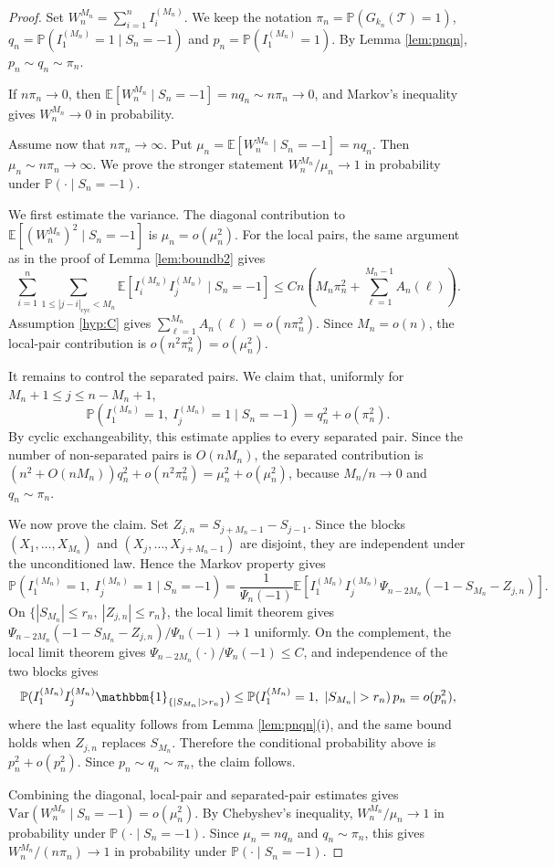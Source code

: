 \documentclass[a4paper,11pt]{article}
\newcommand{\E}{\mathbb{E}}
\DeclareRobustCommand{\P}{\mathbb{P}}
\DeclareRobustCommand{\1}{\mathbf{1}}
\newcommand{\Var}{\mathrm{Var}}
\begin{document}
\begin{proof}
Set $W_n^{M_n}=\sum_{i=1}^n I_i^{(M_n)}$. We keep the notation $ \pi_{n}=\P(G_{k_{n}}( \mathcal{T})=1)$, $q_n=\P(I_1^{(M_n)}=1\mid S_n=-1)$ and $p_n=\P(I_1^{(M_n)}=1)$. By Lemma \ref{lem:pnqn}, $p_n \sim q_n \sim \pi_n$.

If $n\pi_n\to0$, then
$\E[W_n^{M_n}\mid S_n=-1]=nq_n\sim n\pi_n\to0$, and Markov's inequality gives
$W_n^{M_n}\to0$ in probability.

Assume now that $n\pi_n\to\infty$. Put
$\mu_n=\E[W_n^{M_n}\mid S_n=-1]=nq_n$. Then
$\mu_n\sim n\pi_n\to\infty$. We prove the stronger statement
$W_n^{M_n}/\mu_n\to1$ in probability under $\P(\cdot\mid S_n=-1)$.

We first estimate the variance. The diagonal contribution to
$\E[(W_n^{M_n})^2\mid S_n=-1]$ is $\mu_n=o(\mu_n^2)$. For the local pairs, the same argument as in the proof of Lemma
\ref{lem:boundb2} gives
$$
\sum_{i=1}^n
\sum_{1\le |j-i|_{\mathrm{cyc}}<M_n}
\E[I_i^{(M_n)}I_j^{(M_n)}\mid S_n=-1]
\le
C n\left(M_n\pi_n^2+\sum_{\ell=1}^{M_n-1}A_n(\ell)\right).
$$
Assumption \ref{hyp:C} gives
$\sum_{\ell=1}^{M_n}A_n(\ell)=o(n\pi_n^2)$. Since $M_n=o(n)$, the local-pair
contribution is $o(n^2\pi_n^2)=o(\mu_n^2)$.

It remains to control the separated pairs. We claim that, uniformly for
$M_n+1\le j\le n-M_n+1$,
$$
\P(I_1^{(M_n)}=1,\ I_j^{(M_n)}=1\mid S_n=-1)
=
q_n^2+o(\pi_n^2).
$$
By cyclic exchangeability, this estimate applies to every separated pair. Since
the number of non-separated pairs is $O(nM_n)$, the separated contribution is
$(n^2+O(nM_n))q_n^2+o(n^2\pi_n^2)=\mu_n^2+o(\mu_n^2)$, because
$M_n/n\to0$ and $q_n\sim\pi_n$.

We now prove the claim. Set $Z_{j,n}=S_{j+M_n-1}-S_{j-1}$. Since the blocks
$(X_1,\ldots,X_{M_n})$ and $(X_j,\ldots,X_{j+M_n-1})$ are disjoint, they are
independent under the unconditioned law. Hence the Markov property gives
$$
\P(I_1^{(M_n)}=1,\ I_j^{(M_n)}=1\mid S_n=-1)
=
\frac{1}{\Psi_n(-1)}
\E\left[
I_1^{(M_n)}I_j^{(M_n)}
\Psi_{n-2M_n}(-1-S_{M_n}-Z_{j,n})
\right].
$$
On $\{|S_{M_n}|\le r_n,\ |Z_{j,n}|\le r_n\}$, the local limit theorem gives
$\Psi_{n-2M_n}(-1-S_{M_n}-Z_{j,n})/\Psi_n(-1)\to1$ uniformly. On the
complement, the local limit theorem gives
$\Psi_{n-2M_n}(\cdot)/\Psi_n(-1)\le C$, and independence of the two blocks
gives
$$
\P(I_1^{(M_n)}I_j^{(M_n)}\mathbbm{1}_{\{|S_{M_n}|>r_n\}})
\le
\P(I_1^{(M_n)}=1,\ |S_{M_n}|>r_n)\,p_n
=o(p_n^2),
$$
where the last equality follows from Lemma \ref{lem:pnqn}\textup{(i)}, and the same bound holds when $Z_{j,n}$ replaces $S_{M_n}$. Therefore the
conditional probability above is $p_n^2+o(p_n^2)$. Since
$p_n\sim q_n\sim\pi_n$, the claim follows.

Combining the diagonal, local-pair and separated-pair estimates gives
$\Var(W_n^{M_n}\mid S_n=-1)=o(\mu_n^2)$. By Chebyshev's inequality,
$W_n^{M_n}/\mu_n\to1$ in probability under $\P(\cdot\mid S_n=-1)$. Since
$\mu_n=nq_n$ and $q_n\sim\pi_n$, this gives
$
{W_n^{M_n}}/(n\pi_n)\to1
$
in probability under $\P(\cdot\mid S_n=-1)$.
\end{proof}
\end{document}
